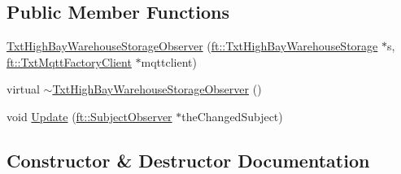 \subsection*{Public Member Functions}
\begin{DoxyCompactItemize}
\item 
\hyperlink{classft_1_1_txt_high_bay_warehouse_storage_observer_a669ec51156c8c2d5a6ffb673baf09fe6}{Txt\+High\+Bay\+Warehouse\+Storage\+Observer} (\hyperlink{classft_1_1_txt_high_bay_warehouse_storage}{ft\+::\+Txt\+High\+Bay\+Warehouse\+Storage} $\ast$s, \hyperlink{classft_1_1_txt_mqtt_factory_client}{ft\+::\+Txt\+Mqtt\+Factory\+Client} $\ast$mqttclient)
\item 
virtual \hyperlink{classft_1_1_txt_high_bay_warehouse_storage_observer_a4bae2f9bc411a0ee9cd71328cad33f35}{$\sim$\+Txt\+High\+Bay\+Warehouse\+Storage\+Observer} ()
\item 
void \hyperlink{classft_1_1_txt_high_bay_warehouse_storage_observer_a0ed13d06ea759d8840fbd1932b203b40}{Update} (\hyperlink{classft_1_1_subject_observer}{ft\+::\+Subject\+Observer} $\ast$the\+Changed\+Subject)
\end{DoxyCompactItemize}


\subsection{Constructor \& Destructor Documentation}
